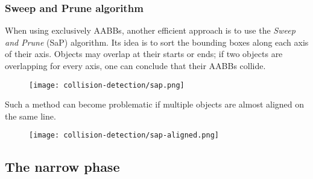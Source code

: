 \subsubsection{Sweep and Prune algorithm}
When using exclusively AABBs, another efficient approach is to use the \emph{Sweep and Prune} (SaP) algorithm. Its idea is to sort the bounding boxes along each axis of their axis. Objects may overlap at their starts or ends; if two objects are overlapping for every axis, one can conclude that their AABBs collide.
\begin{figure}[H]
    \centering
    \texttt{[image: collision-detection/sap.png]}
\end{figure}
Such a method can become problematic if multiple objects are almost aligned on the same line.
\begin{figure}[H]
    \centering
    \texttt{[image: collision-detection/sap-aligned.png]}
\end{figure}

\subsection{The narrow phase}

\newpage